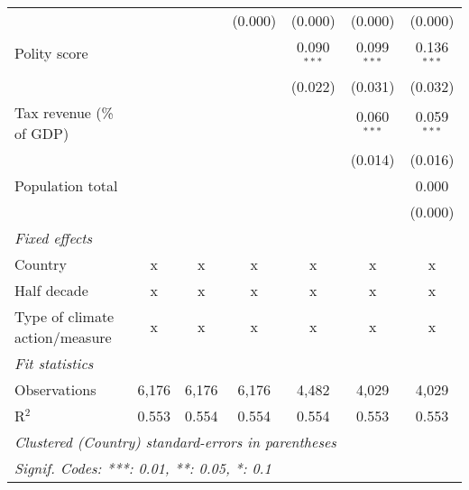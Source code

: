 \begin{tabular}{lcccccc}
                                                                                  &         &                & (0.000)        & (0.000)        & (0.000)        & (0.000)\\   
   Polity score                                                                   &         &                &                & 0.090$^{***}$  & 0.099$^{***}$  & 0.136$^{***}$\\   
                                                                                  &         &                &                & (0.022)        & (0.031)        & (0.032)\\   
   Tax revenue (\% of GDP)                                                        &         &                &                &                & 0.060$^{***}$  & 0.059$^{***}$\\   
                                                                                  &         &                &                &                & (0.014)        & (0.016)\\   
   Population total                                                               &         &                &                &                &                & 0.000\\   
                                                                                  &         &                &                &                &                & (0.000)\\   
   \emph{Fixed effects}\\
   Country                                                                        & x       & x              & x              & x              & x              & x\\  
   Half decade                                                                    & x       & x              & x              & x              & x              & x\\  
   Type of climate action/measure                                                 & x       & x              & x              & x              & x              & x\\  
   \midrule \emph{Fit statistics}\\
   Observations                                                                   & 6,176   & 6,176          & 6,176          & 4,482          & 4,029          & 4,029\\  
   R$^2$                                                                          & 0.553   & 0.554          & 0.554          & 0.554          & 0.553          & 0.553\\  
   \midrule
   \multicolumn{7}{l}{\emph{Clustered (Country) standard-errors in parentheses}}\\
   \multicolumn{7}{l}{\emph{Signif. Codes: ***: 0.01, **: 0.05, *: 0.1}}\\
\end{tabular}
\par\endgroup


